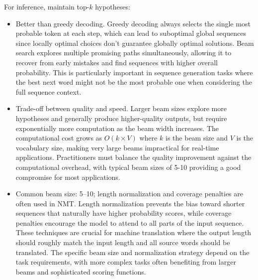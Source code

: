 For inference, maintain top-$k$ hypotheses:
\begin{itemize}
    \item Better than greedy decoding. Greedy decoding always selects the single most probable token at each step, which can lead to suboptimal global sequences since locally optimal choices don't guarantee globally optimal solutions. Beam search explores multiple promising paths simultaneously, allowing it to recover from early mistakes and find sequences with higher overall probability. This is particularly important in sequence generation tasks where the best next word might not be the most probable one when considering the full sequence context.
    
    \item Trade-off between quality and speed. Larger beam sizes explore more hypotheses and generally produce higher-quality outputs, but require exponentially more computation as the beam width increases. The computational cost grows as $O(k \times V)$ where $k$ is the beam size and $V$ is the vocabulary size, making very large beams impractical for real-time applications. Practitioners must balance the quality improvement against the computational overhead, with typical beam sizes of 5-10 providing a good compromise for most applications.
    
    \item Common beam size: 5–10; length normalization and coverage penalties are often used in NMT. Length normalization prevents the bias toward shorter sequences that naturally have higher probability scores, while coverage penalties encourage the model to attend to all parts of the input sequence. These techniques are crucial for machine translation where the output length should roughly match the input length and all source words should be translated. The specific beam size and normalization strategy depend on the task requirements, with more complex tasks often benefiting from larger beams and sophisticated scoring functions.
\end{itemize}
